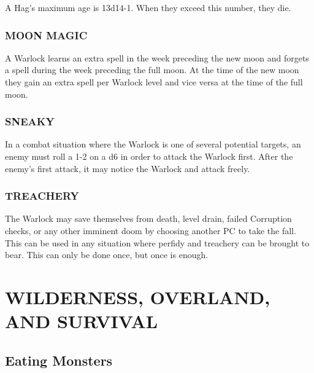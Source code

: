 \documentclass[twoside]{article}
\begin{document}
\bigbreak

A Hag's maximum age is 13d14-1. When they exceed this number, they die.

\subsubsection*{\footnotesize{M}\scriptsize{OON} \footnotesize{M}\scriptsize{AGIC}\normalsize}

​A Warlock learns an extra spell in the week preceding the new moon and forgets a spell during the week preceding the full moon. At the time of the new moon they gain an extra spell per Warlock level and vice versa at the time of the full moon.

\subsubsection*{\footnotesize{S}\scriptsize{NEAKY}\normalsize}

In a combat situation where the Warlock is one of several potential targets, an enemy must roll a 1-2 on a d6 in order to attack the Warlock first. After the enemy's first attack, it may notice the Warlock and attack freely.

\subsubsection*{\footnotesize{T}\scriptsize{REACHERY}\normalsize}

The Warlock may save themselves from death, level drain, failed Corruption checks, or any other imminent doom by choosing another PC to take the fall. This can be used in any situation where perfidy and treachery can be brought to bear. This can only be done once, but once is enough.

\section*{WILDERNESS, OVERLAND, AND SURVIVAL}

\subsection*{Eating Monsters}
\end{document}
